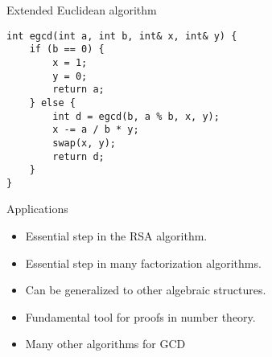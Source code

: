 \documentclass[10pt]{beamer}
\newcommand{\bi}{\begin{itemize}}
\newcommand{\ei}{\end{itemize}}
\begin{document}
\begin{frame}[fragile]{Extended Euclidean algorithm}
  \vspace{10pt}
    \begin{verbatim}
int egcd(int a, int b, int& x, int& y) {
    if (b == 0) {
        x = 1;
        y = 0;
        return a;
    } else {
        int d = egcd(b, a % b, x, y);
        x -= a / b * y;
        swap(x, y);
        return d;
    }
}
    \end{verbatim}
\end{frame}

\begin{frame}{Applications}
  \vspace{40pt}
  \bi
    \item Essential step in the RSA algorithm.
    \item Essential step in many factorization algorithms.
    \item Can be generalized to other algebraic structures.
    \item Fundamental tool for proofs in number theory.
    \item Many other algorithms for GCD
  \ei
\end{frame}


\end{document}
